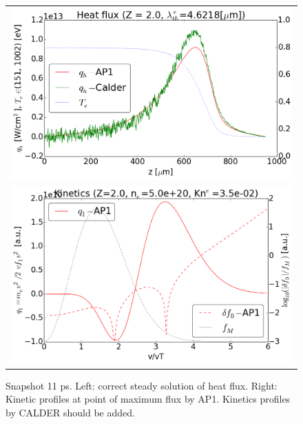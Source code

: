 \begin{figure}[tbh]
  \begin{center}
    \begin{tabular}{c}
      \includegraphics[width=\figscale\textwidth]{../VFPdata/C7_Calder_case1_heatflux.png} \\ 
      \includegraphics[width=\figscale\textwidth]{../VFPdata/C7_Calder_case1_kinetics.png}
    \end{tabular}
  \caption{  
  Snapshot 11 ps. Left: correct steady solution of heat flux. Right: Kinetic profiles at point of maximum flux by AP1. Kinetics profiles by CALDER should be added.
  }
  \end{center}
  \label{fig:C7_CALDER_case1}
\end{figure}

